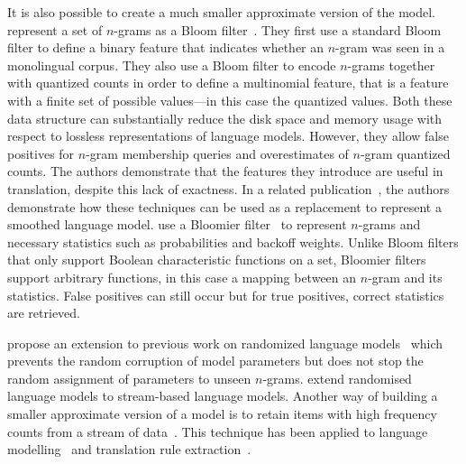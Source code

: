 It is also possible to create a much smaller approximate version of the model.
\citet{talbot-osborne:2007:ACL} represent a set of $n$-grams as a Bloom
filter~\citep{bloom:1970:ACM}.
They first use a standard Bloom filter to define a binary feature that
indicates whether an $n$-gram was seen in a monolingual corpus. They
also use a Bloom filter to encode $n$-grams together with quantized counts
in order to define a multinomial feature, that is a feature
with a finite set of possible values---in this case the quantized values. Both these data structure can
substantially reduce the disk space and memory usage with respect to lossless
representations of language models. However, they allow
false positives for $n$-gram
membership queries and overestimates of $n$-gram quantized counts. The authors
demonstrate that the features they introduce are useful in translation, despite
this lack of exactness.
In a related publication~\citep{talbot-osborne:2007:EMNLP-CoNLL}, the authors
demonstrate how these techniques can be used as a replacement to represent
a smoothed language model. \citet{talbot-brants:2008:ACL} use a Bloomier
filter~\citep{chazelle-kilian-rubinfeld-tal:2004:ACM-SIAM}
to represent $n$-grams and necessary statistics such as probabilities and backoff
weights. Unlike Bloom filters that only support Boolean characteristic
functions on a set, Bloomier filters support arbitrary functions, in this case
a mapping between an $n$-gram and its statistics. False positives can still occur
but for true positives, correct statistics are retrieved.


\citet{guthrie-hepple:2010:EMNLP} propose an extension to previous work
on randomized language models~\citep{talbot-osborne:2007:EMNLP-CoNLL} which prevents
the random corruption of model parameters but does not stop the random
assignment of parameters to unseen $n$-grams.
\citet{levenberg-osborne:2009:EMNLP} extend randomised language models to
stream-based language models. Another way of building a smaller approximate
version of a model is to retain items with high frequency counts from a stream
of data~\citep{manku-motwani:2002:VLDB}. This technique has been applied to
language modelling~\citep{goyal-daumeiii-venkatasubramanian:2009:NAACL} and
translation rule extraction~\citep{przywara-bojar:2011:PBML}. 


